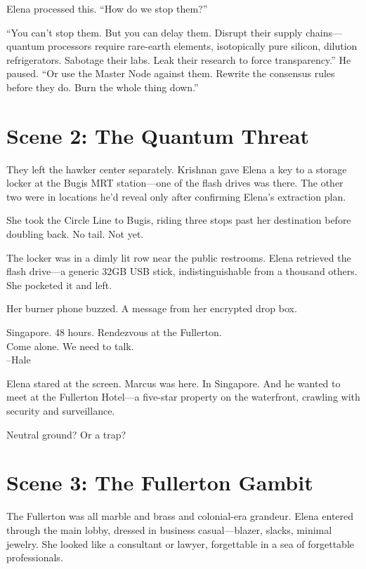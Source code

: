 \documentclass[12pt,oneside]{book}
\begin{document}
Elena processed this. ``How do we stop them?''

``You can't stop them. But you can delay them. Disrupt their supply chains—quantum processors require rare-earth elements, isotopically pure silicon, dilution refrigerators. Sabotage their labs. Leak their research to force transparency.'' He paused. ``Or use the Master Node against them. Rewrite the consensus rules before they do. Burn the whole thing down.''

\section*{Scene 2: The Quantum Threat}

They left the hawker center separately. Krishnan gave Elena a key to a storage locker at the Bugis MRT station—one of the flash drives was there. The other two were in locations he'd reveal only after confirming Elena's extraction plan.

She took the Circle Line to Bugis, riding three stops past her destination before doubling back. No tail. Not yet.

The locker was in a dimly lit row near the public restrooms. Elena retrieved the flash drive—a generic 32GB USB stick, indistinguishable from a thousand others. She pocketed it and left.

Her burner phone buzzed. A message from her encrypted drop box.

\begin{terminalbox}
Singapore. 48 hours. Rendezvous at the Fullerton.\\
Come alone. We need to talk.\\
--Hale
\end{terminalbox}

Elena stared at the screen. Marcus was here. In Singapore. And he wanted to meet at the Fullerton Hotel—a five-star property on the waterfront, crawling with security and surveillance.

Neutral ground? Or a trap?

\section*{Scene 3: The Fullerton Gambit}

The Fullerton was all marble and brass and colonial-era grandeur. Elena entered through the main lobby, dressed in business casual—blazer, slacks, minimal jewelry. She looked like a consultant or lawyer, forgettable in a sea of forgettable professionals.
\end{document}
